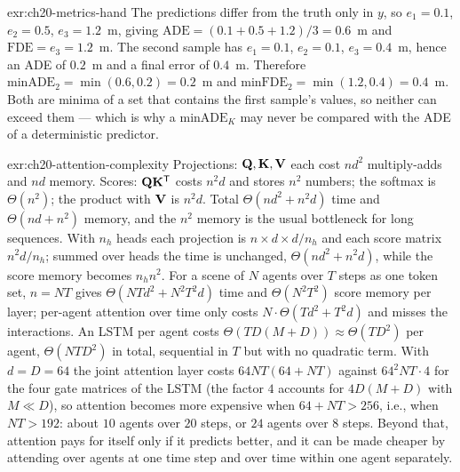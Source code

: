 \begin{solution}{exr:ch20-metrics-hand}
The predictions differ from the truth only in $y$, so $e_1 = 0.1$, $e_2 = 0.5$, $e_3 = 1.2$~m, giving $\mathrm{ADE} = (0.1 + 0.5 + 1.2)/3 = 0.6$~m and $\mathrm{FDE} = e_3 = 1.2$~m. The second sample has $e_1 = 0.1$, $e_2 = 0.1$, $e_3 = 0.4$~m, hence an ADE of $0.2$~m and a final error of $0.4$~m. Therefore $\mathrm{minADE}_2 = \min(0.6, 0.2) = 0.2$~m and $\mathrm{minFDE}_2 = \min(1.2, 0.4) = 0.4$~m. Both are minima of a set that contains the first sample's values, so neither can exceed them --- which is why a $\mathrm{minADE}_K$ may never be compared with the ADE of a deterministic predictor.
\end{solution}

\begin{solution}{exr:ch20-attention-complexity}
Projections: $\mathbf{Q}, \mathbf{K}, \mathbf{V}$ each cost $n d^2$ multiply-adds and $nd$ memory. Scores: $\mathbf{Q}\mathbf{K}^{\mathsf{T}}$ costs $n^2 d$ and stores $n^2$ numbers; the softmax is $\Theta(n^2)$; the product with $\mathbf{V}$ is $n^2 d$. Total $\Theta(n d^2 + n^2 d)$ time and $\Theta(n d + n^2)$ memory, and the $n^2$ memory is the usual bottleneck for long sequences. With $n_h$ heads each projection is $n \times d \times d/n_h$ and each score matrix $n^2 d/n_h$; summed over heads the time is unchanged, $\Theta(n d^2 + n^2 d)$, while the score memory becomes $n_h n^2$. For a scene of $N$ agents over $T$ steps as one token set, $n = NT$ gives $\Theta(NT d^2 + N^2T^2 d)$ time and $\Theta(N^2 T^2)$ score memory per layer; per-agent attention over time only costs $N \cdot \Theta(T d^2 + T^2 d)$ and misses the interactions. An LSTM per agent costs $\Theta(T D(M + D)) \approx \Theta(T D^2)$ per agent, $\Theta(N T D^2)$ in total, sequential in $T$ but with no quadratic term. With $d = D = 64$ the joint attention layer costs $64 NT (64 + NT)$ against $64^2 NT \cdot 4$ for the four gate matrices of the LSTM (the factor $4$ accounts for $4D(M + D)$ with $M \ll D$), so attention becomes more expensive when $64 + NT > 256$, i.e., when $NT > 192$: about $10$ agents over $20$ steps, or $24$ agents over $8$ steps. Beyond that, attention pays for itself only if it predicts better, and it can be made cheaper by attending over agents at one time step and over time within one agent separately.
\end{solution}

